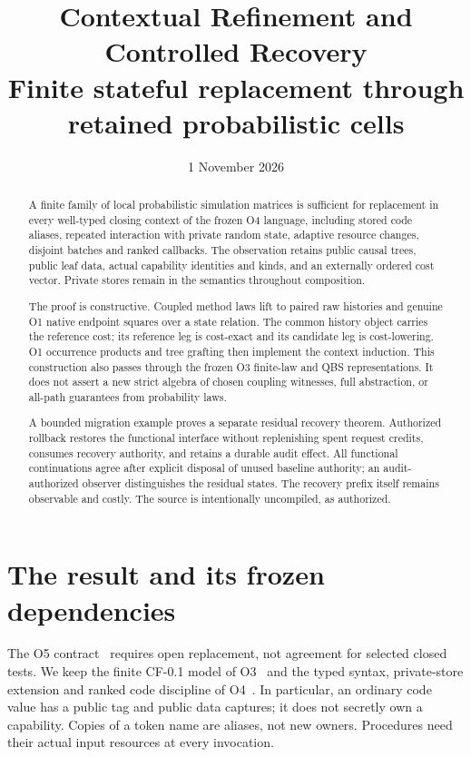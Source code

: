 \documentclass[11pt,a4paper]{article}
\title{Contextual Refinement and Controlled Recovery\\[5pt]
\large Finite stateful replacement through retained probabilistic cells}
\author{}
\date{1 November 2026}
\theoremstyle{definition}
\begin{document}
\maketitle

\begin{abstract}
A finite family of local probabilistic simulation matrices is sufficient
for replacement in every well-typed closing context of the frozen O4
language, including stored code aliases, repeated interaction with private
random state, adaptive resource changes, disjoint batches and ranked
callbacks. The observation retains public causal trees, public leaf data,
actual capability identities and kinds, and an externally ordered cost
vector. Private stores remain in the semantics throughout composition.

The proof is constructive. Coupled method laws lift to paired raw
histories and genuine O1 native endpoint squares over a state relation.
The common history object carries the reference cost; its reference leg
is cost-exact and its candidate leg is cost-lowering. O1 occurrence
products and tree grafting then implement the context induction. This
construction also passes through the frozen O3 finite-law and QBS
representations. It does not assert a new strict algebra of chosen
coupling witnesses, full abstraction, or all-path guarantees from
probability laws.

A bounded migration example proves a separate residual recovery theorem.
Authorized rollback restores the functional interface without replenishing
spent request credits, consumes recovery authority, and retains a durable
audit effect. All functional continuations agree after explicit disposal
of unused baseline authority; an audit-authorized observer distinguishes
the residual states. The recovery prefix itself remains observable and
costly. The source is intentionally uncompiled, as authorized.
\end{abstract}
\tableofcontents

\section{The result and its frozen dependencies}\label{sec:scope}
The O5 contract~\cite{Contract} requires open replacement, not agreement
for selected closed tests. We keep the finite CF-0.1 model of O3~\cite{O3}
and the typed syntax, private-store extension and ranked code discipline
of O4~\cite{O4}. In particular, an ordinary code value has a public tag
and public data captures; it does not secretly own a capability. Copies
of a token name are aliases, not new owners. Procedures need their actual
input resources at every invocation.
\end{document}

